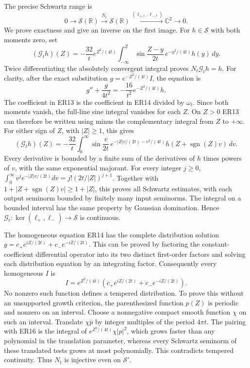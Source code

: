 The precise Schwartz range is
\[
 0\longrightarrow\mathcal S(\mathbb R)
 \xrightarrow{N_t}\mathcal S(\mathbb R)
 \xrightarrow{(\ell_{+,t},\ell_{-,t})}\mathbb C^2
 \longrightarrow0.
 \tag{ER12}
\]
We prove exactness and give an inverse on the first image.
For \(h\in\mathcal S\) with both moments zero, set
\[
 (\mathcal G_th)(Z)
 =-\frac{32}{t}e^{Z^2/(4t)}
   \int_{-\infty}^Z
   \sin\!\frac{Z-y}{2t}\,e^{-y^2/(4t)}h(y)\,dy .
 \tag{ER13}
\]
Twice differentiating the absolutely convergent integral proves
\(N_t\mathcal G_th=h\).
For clarity, after the exact substitution
\(g=e^{-Z^2/(4t)}I\), the equation is
\[
 g''+\frac{g}{4t^2}
       =-\frac{16}{t^2}e^{-Z^2/(4t)}h.
 \tag{ER14}
\]
The coefficient in ER13 is the coefficient in ER14 divided by
\(\omega_t\). Since both moments vanish, the full-line sine integral
vanishes for each \(Z\). On \(Z>0\) ER13 can therefore be written
using minus the complementary integral from \(Z\) to \(+\infty\).
For either sign of \(Z\), with \(|Z|\ge1\), this gives
\[
 (\mathcal G_th)(Z)=
 -\frac{32}{t}\int_0^\infty
 \sin\!\frac{v}{2t}\,
 e^{-|Z|v/(2t)-v^2/(4t)}
 h(Z+\operatorname{sgn}(Z)v)\,dv .
 \tag{ER15}
\]
Every derivative is bounded by a finite sum of the derivatives of
\(h\) times powers of \(v\), with the same exponential majorant.
For every integer \(j\ge0\),
\(\int_0^\infty v^j e^{-|Z|v/(2t)}dv
 =j!(2t/|Z|)^{j+1}\).
Together with
\(1+|Z+\operatorname{sgn}(Z)v|\ge1+|Z|\),
this proves all Schwartz estimates, with each output seminorm bounded
by finitely many input seminorms. The integral on a bounded interval
has the same property by Gaussian domination. Hence
\(\mathcal G_t:\ker(\ell_+,\ell_-)\to\mathcal S\) is continuous.

The homogeneous equation ER14 has the complete distribution solution
\(g=c_+e^{iZ/(2t)}+c_-e^{-iZ/(2t)}\). This can be proved by
factoring the constant-coefficient differential operator into its two
distinct first-order factors and solving each distribution equation
by an integrating factor. Consequently every homogeneous \(I\) is
\[
 I=e^{Z^2/(4t)}
       (c_+e^{iZ/(2t)}+c_-e^{-iZ/(2t)}).
 \tag{ER16}
\]
No nonzero such function defines a tempered distribution. To prove
this without an unsupported growth criterion, the parenthesized
function \(p(Z)\) is periodic and nonzero on an interval. Choose a
nonnegative compact smooth function \(\chi\) on such an interval.
Translate \(\chi\overline p\) by integer multiples of the period
\(4\pi t\). The pairing with ER16 is the integral of
\(e^{Z^2/(4t)}\chi|p|^2\), which grows faster than any polynomial
in the translation parameter, whereas every Schwartz seminorm of
these translated tests grows at most polynomially. This contradicts
tempered continuity. Thus \(N_t\) is injective even on \(\mathcal S'\).

